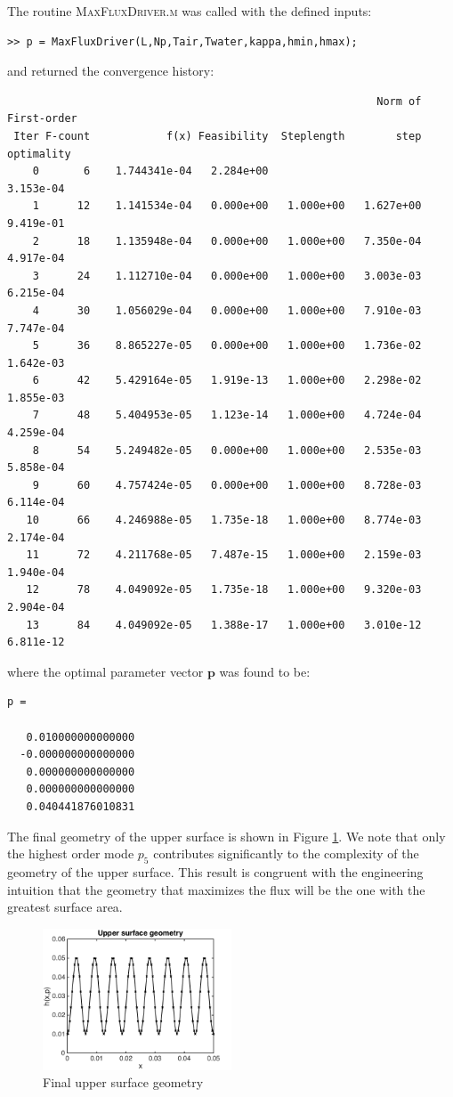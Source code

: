 \documentclass[11pt]{article}
\begin{document}
The routine \textsc{MaxFluxDriver.m} was called with the defined
inputs:
\begin{verbatim}
>> p = MaxFluxDriver(L,Np,Tair,Twater,kappa,hmin,hmax);
\end{verbatim}
and returned the convergence history:
\begin{verbatim}
                                                          Norm of First-order
 Iter F-count            f(x) Feasibility  Steplength        step  optimality
    0       6    1.744341e-04   2.284e+00                           3.153e-04
    1      12    1.141534e-04   0.000e+00   1.000e+00   1.627e+00   9.419e-01
    2      18    1.135948e-04   0.000e+00   1.000e+00   7.350e-04   4.917e-04
    3      24    1.112710e-04   0.000e+00   1.000e+00   3.003e-03   6.215e-04
    4      30    1.056029e-04   0.000e+00   1.000e+00   7.910e-03   7.747e-04
    5      36    8.865227e-05   0.000e+00   1.000e+00   1.736e-02   1.642e-03
    6      42    5.429164e-05   1.919e-13   1.000e+00   2.298e-02   1.855e-03
    7      48    5.404953e-05   1.123e-14   1.000e+00   4.724e-04   4.259e-04
    8      54    5.249482e-05   0.000e+00   1.000e+00   2.535e-03   5.858e-04
    9      60    4.757424e-05   0.000e+00   1.000e+00   8.728e-03   6.114e-04
   10      66    4.246988e-05   1.735e-18   1.000e+00   8.774e-03   2.174e-04
   11      72    4.211768e-05   7.487e-15   1.000e+00   2.159e-03   1.940e-04
   12      78    4.049092e-05   1.735e-18   1.000e+00   9.320e-03   2.904e-04
   13      84    4.049092e-05   1.388e-17   1.000e+00   3.010e-12   6.811e-12
\end{verbatim}
where the optimal parameter vector $\boldsymbol{p}$ was found to be:

\newpage

\begin{verbatim}
p =

   0.010000000000000
  -0.000000000000000
   0.000000000000000
   0.000000000000000
   0.040441876010831
\end{verbatim}
The final geometry of the upper surface is shown in Figure
\ref{fig:geometry}. We note that only the highest order mode
$p_5$ contributes significantly to the complexity of the geometry
of the upper surface. This result is congruent with the engineering
intuition that the geometry that maximizes the flux will be the one with
the greatest surface area.

\begin{figure}[hbt]
\centering
\includegraphics[width=0.5\textwidth]{geometry}
\caption{Final upper surface geometry}
\label{fig:geometry}
\end{figure}
\end{document}
